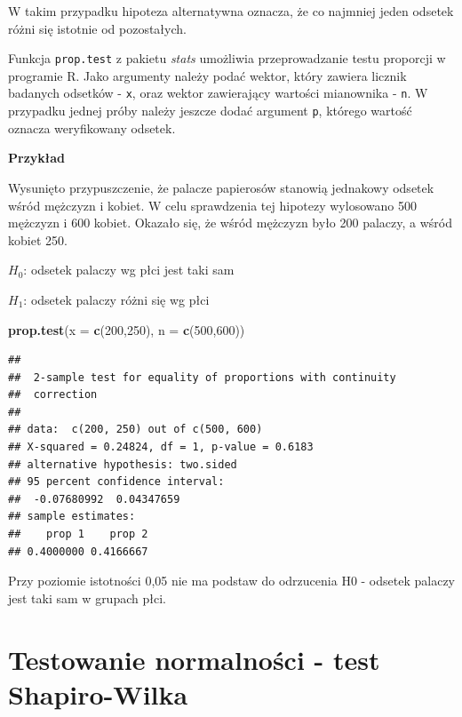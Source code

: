 \documentclass[]{book}
\newenvironment{Shaded}{\begin{snugshade}}{\end{snugshade}}
\newcommand{\DataTypeTok}[1]{\textcolor[rgb]{0.13,0.29,0.53}{#1}}
\newcommand{\DecValTok}[1]{\textcolor[rgb]{0.00,0.00,0.81}{#1}}
\newcommand{\KeywordTok}[1]{\textcolor[rgb]{0.13,0.29,0.53}{\textbf{#1}}}
\newcommand{\NormalTok}[1]{#1}
\begin{document}
W takim przypadku hipoteza alternatywna oznacza, że co najmniej jeden odsetek różni się istotnie od pozostałych.

Funkcja \texttt{prop.test} z pakietu \emph{stats} umożliwia przeprowadzanie testu proporcji w programie R. Jako argumenty należy podać wektor, który zawiera licznik badanych odsetków - \texttt{x}, oraz wektor zawierający wartości mianownika - \texttt{n}. W przypadku jednej próby należy jeszcze dodać argument \texttt{p}, którego wartość oznacza weryfikowany odsetek.

\textbf{Przykład}

Wysunięto przypuszczenie, że palacze papierosów stanowią jednakowy odsetek wśród mężczyzn i kobiet. W celu sprawdzenia tej hipotezy wylosowano 500 mężczyzn i 600 kobiet. Okazało się, że wśród mężczyzn było 200 palaczy, a wśród kobiet 250.

\(H_0\): odsetek palaczy wg płci jest taki sam

\(H_1\): odsetek palaczy różni się wg płci

\begin{Shaded}
\begin{Highlighting}[]
\KeywordTok{prop.test}\NormalTok{(}\DataTypeTok{x =} \KeywordTok{c}\NormalTok{(}\DecValTok{200}\NormalTok{,}\DecValTok{250}\NormalTok{), }\DataTypeTok{n =} \KeywordTok{c}\NormalTok{(}\DecValTok{500}\NormalTok{,}\DecValTok{600}\NormalTok{))}
\end{Highlighting}
\end{Shaded}

\begin{verbatim}
## 
##  2-sample test for equality of proportions with continuity
##  correction
## 
## data:  c(200, 250) out of c(500, 600)
## X-squared = 0.24824, df = 1, p-value = 0.6183
## alternative hypothesis: two.sided
## 95 percent confidence interval:
##  -0.07680992  0.04347659
## sample estimates:
##    prop 1    prop 2 
## 0.4000000 0.4166667
\end{verbatim}

Przy poziomie istotności 0,05 nie ma podstaw do odrzucenia H0 - odsetek palaczy jest taki sam w grupach płci.

\hypertarget{testowanie-normalnosci---test-shapiro-wilka}{%
\section{Testowanie normalności - test Shapiro-Wilka}\label{testowanie-normalnosci---test-shapiro-wilka}}
\end{document}
